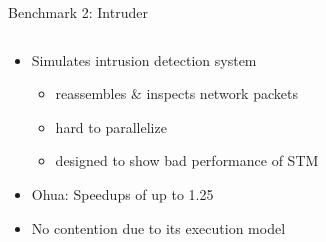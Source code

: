 \documentclass[aspectratio=169, usenames, dvipsnames]{beamer}
\begin{document}
\begin{frame}{Benchmark 2: Intruder}
  \begin{columns}
    \begin{column}{0.55\textwidth}
      \begin{itemize}
        \item Simulates intrusion detection system
        \begin{itemize}
          \item<2-> reassembles \& inspects network packets
          \item<3-> hard to parallelize
          \item<4-> designed to show bad performance of STM\\[.55\baselineskip]
        \end{itemize}
        \item<6-> Ohua: Speedups of up to 1.25
        \item<7-> No contention due to its execution model %
      \end{itemize}
    \end{column}
    \begin{column}{0.45\textwidth}
    \end{column}
  \end{columns}
\end{frame}
\end{document}
